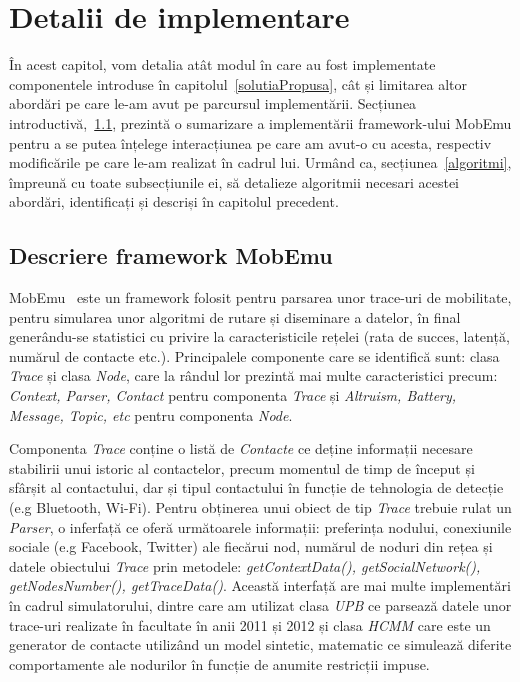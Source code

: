 \documentclass[12pt,a4paper]{report}
\begin{document}
\chapter{Detalii de implementare}	\label{detalii}

În acest capitol, vom detalia atât modul în care au fost implementate componentele introduse în capitolul~\ref{solutiaPropusa}, cât și limitarea altor abordări pe care le-am avut pe parcursul implementării. Secțiunea introductivă,~\ref{introducere}, prezintă o sumarizare a implementării framework-ului MobEmu pentru a se putea înțelege interacțiunea pe care am avut-o cu acesta, respectiv modificările pe care le-am realizat în cadrul lui. 
Urmând ca, secțiunea~\ref{algoritmi}, împreună cu toate subsecțiunile ei, să detalieze algoritmii necesari acestei abordări, identificați și descriși în capitolul precedent.
 
\section{Descriere framework MobEmu} \label{introducere}
MobEmu~\cite{MobEmuArticle} este un framework folosit pentru parsarea unor trace-uri de mobilitate, pentru simularea unor algoritmi de rutare și diseminare a datelor, în final generându-se statistici cu privire la caracteristicile rețelei (rata de succes, latență, numărul de contacte etc.). Principalele componente care se identifică sunt:  clasa \textit{Trace} și clasa \textit{Node}, care la rândul lor prezintă mai multe caracteristici precum: \textit{Context, Parser, Contact} pentru componenta \textit{Trace} și \textit{Altruism, Battery, Message, Topic, etc} pentru componenta \textit{Node}.

Componenta \textit{Trace} conține o listă de \textit{Contacte} ce deține informații necesare stabilirii unui istoric al contactelor, precum momentul de timp de început și sfârșit al contactului, dar și tipul contactului în funcție de tehnologia de detecție (e.g Bluetooth, Wi-Fi). Pentru obținerea unui obiect de tip \textit{Trace} trebuie rulat un \textit{Parser}, o inferfață ce oferă următoarele informații: preferința nodului, conexiunile sociale (e.g Facebook, Twitter) ale fiecărui nod, numărul de noduri din rețea și datele obiectului \textit{Trace} prin metodele: \textit{getContextData(), getSocialNetwork(), getNodesNumber(), getTraceData()}. Această interfață are mai multe implementări în cadrul simulatorului, dintre care am utilizat clasa \textit{UPB} ce parsează datele unor trace-uri realizate în facultate în anii 2011 și 2012 și clasa \textit{HCMM} care este un generator de contacte utilizând un model sintetic, matematic ce simulează diferite comportamente ale nodurilor în funcție de anumite restricții impuse.
\end{document}
